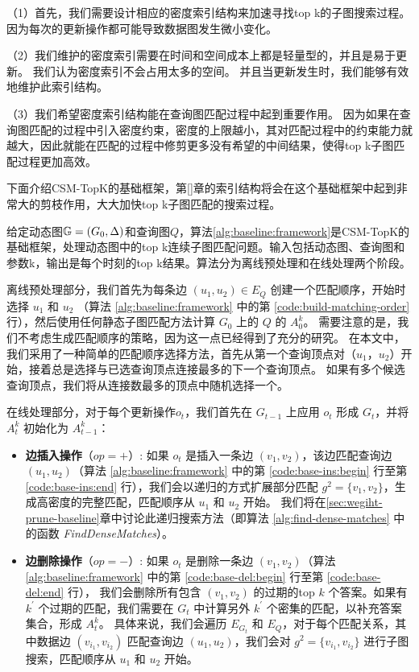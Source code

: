 （1）首先，我们需要设计相应的密度索引结构来加速寻找top k的子图搜索过程。
因为每次的更新操作都可能导致数据图发生微小变化。

（2）我们维护的密度索引需要在时间和空间成本上都是轻量型的，并且是易于更新。
我们认为密度索引不会占用太多的空间。
并且当更新发生时，我们能够有效地维护此索引结构。

（3）我们希望密度索引结构能在查询图匹配过程中起到重要作用。
因为如果在查询图匹配的过程中引入密度约束，密度的上限越小，其对匹配过程中的约束能力就越大，因此就能在匹配的过程中修剪更多没有希望的中间结果，使得top k子图匹配过程更加高效。

下面介绍CSM-TopK的基础框架，第\ref{}章的索引结构将会在这个基础框架中起到非常大的剪枝作用，大大加快top k子图匹配的搜索过程。


给定动态图$\mathbb{G}=(G_0, \Delta)$和查询图$Q$，算法\ref{alg:baseline:framework}是CSM-TopK的基础框架，处理动态图中的top k连续子图匹配问题。输入包括动态图、查询图和参数k，输出是每个时刻的top k结果。算法分为离线预处理和在线处理两个阶段。

离线预处理部分，我们首先为每条边 $(u_1, u_2) \in E_Q$ 创建一个匹配顺序，开始时选择 $u_1$ 和 $u_2$ （算法 \ref{alg:baseline:framework} 中的第 \ref{code:build-matching-order} 行），然后使用任何静态子图匹配方法计算 $G_0$ 上的 $Q$ 的 $A_0^k$。
需要注意的是，我们不考虑生成匹配顺序的策略，因为这一点已经得到了充分的研究。
在本文中，我们采用了一种简单的匹配顺序选择方法，首先从第一个查询顶点对（$u_1$，$u_2$）开始，接着总是选择与已选查询顶点连接最多的下一个查询顶点。
如果有多个候选查询顶点，我们将从连接数最多的顶点中随机选择一个。

在线处理部分，对于每个更新操作$o_t$，我们首先在 $G_{t-1}$ 上应用 $o_t$ 形成 $G_t$，并将 $A_t^k$ 初始化为 $A_{t-1}^k$：
\begin{itemize}
    \item \textbf{边插入操作}（$op=+$）: 如果 $o_t$ 是插入一条边 $(v_1, v_2)$，该边匹配查询边 $(u_1, u_2)$（算法 \ref{alg:baseline:framework} 中的第 \ref{code:base-ins:begin} 行至第 \ref{code:base-ins:end} 行），我们会以递归的方式扩展部分匹配 $g^2 = \{v_1, v_2\}$，生成高密度的完整匹配，匹配顺序从 $u_1$ 和 $u_2$ 开始。
    我们将在\ref{sec:wegiht-prune-baseline}章中讨论此递归搜索方法（即算法 \ref{alg:find-dense-matches} 中的函数 \emph{FindDenseMatches}）。
    \item \textbf{边删除操作}（$op=-$）:  如果 $o_t$ 是删除一条边 $(v_1, v_2)$（算法 \ref{alg:baseline:framework} 中的第 \ref{code:base-del:begin} 行至第 \ref{code:base-del:end} 行），
    我们会删除所有包含 $(v_1, v_2)$ 的过期的top $k$ 个答案。如果有 $k^\prime$ 个过期的匹配，我们需要在 $G_t$ 中计算另外 $k^\prime$ 个密集的匹配，以补充答案集合，形成 $A_{t}^k$。
    具体来说，我们会遍历 $E_{G_t}$ 和 $E_Q$，对于每个匹配关系，其中数据边 $(v_{i_1}, v_{i_2})$ 匹配查询边 $(u_1, u_2)$，我们会对 $g^2 = \{v_{i_1}, v_{i_2}\}$ 进行子图搜索，匹配顺序从 $u_1$ 和 $u_2$ 开始。
\end{itemize}

